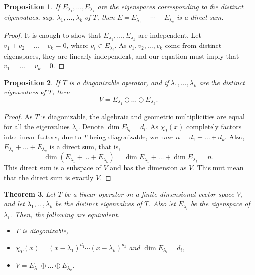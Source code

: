 \documentclass[15pt,a4paper]{book}
\newtheorem{theorem}{Theorem}[chapter]
\newtheorem{proposition}[theorem]{Proposition}
\theoremstyle{definition}
\begin{document}
\begin{proposition}
    If $E_{\lambda_{1}},\ldots,E_{\lambda_{k}}$ are the eigenspaces corresponding to the distinct eigenvalues, say, $\lambda_{1},\ldots,\lambda_{k}$ of $T$, then $E = E_{\lambda_{1}} + \cdots + E_{\lambda_{k}}$ is a direct sum.
\end{proposition}
\begin{proof}
    It is enough to show that $E_{\lambda_{1}},\ldots,E_{\lambda_{k}}$ are independent. Let $v_{1}+v_{2}+\ldots+v_{k} = 0$, where $v_{i} \in E_{\lambda_{i}}$. As $v_{1},v_{2},\ldots,v_{k}$ come from distinct eigenspaces, they are linearly independent, and our equation must imply that $v_{1} = \ldots = v_{k} = 0$.
\end{proof}
\begin{proposition}
    If $T$ is a diagonizable operator, and if $\lambda_{1},\ldots,\lambda_{k}$ are the distinct eigenvalues of $T$, then
    \begin{equation}
        V = E_{\lambda_{1}} \oplus \ldots \oplus E_{\lambda_{k}}.
    \end{equation}
\end{proposition}
\begin{proof}
    As $T$ is diagonizable, the algebraic and geometric multiplicities are equal for all the eigenvalues $\lambda_{i}$. Denote $\dim E_{\lambda_{i}} = d_{i}$. As $\chi_{T}(x)$ completely factors into linear factors, due to $T$ being diagonizable, we have $n = d_{1} + \ldots + d_{k}$. Also, $E_{\lambda_{1}} + \ldots + E_{\lambda_{k}}$ is a direct sum, that is,
    \begin{equation}
        \dim(E_{\lambda_{1}}+\ldots+E_{\lambda_{k}}) = \dim E_{\lambda_{1}} + \ldots + \dim E_{\lambda_{k}} = n.
    \end{equation}
    This direct sum is a subspace of $V$ and has the dimension as $V$. This mut mean that the direct sum is exactly $V$.
\end{proof}

\begin{theorem}
    Let $T$ be a linear operator on a finite dimensional vector space $V$, and let $\lambda_{1},\ldots,\lambda_{k}$ be the distinct eigenvalues of $T$. Also let $E_{\lambda_{i}}$ be the eigenspace of $\lambda_{i}$. Then, the following are equivalent.
    \begin{itemize}
        \item $T$ is diagonizable,
        \item $\chi_{T}(x) = (x-\lambda_{1})^{d_{1}} \cdots (x-\lambda_{k})^{d_{k}}$ and $\dim E_{\lambda_{i}} = d_{i}$,
        \item $V = E_{\lambda_{1}} \oplus \ldots \oplus E_{\lambda_{k}}$.
    \end{itemize}
\end{theorem}
\end{document}
